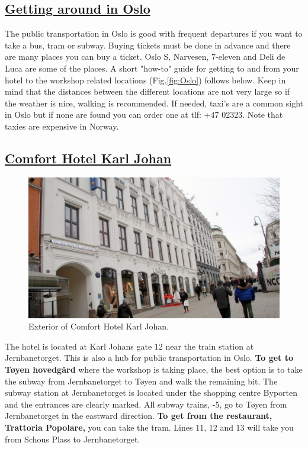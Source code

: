 \documentclass{article}
\begin{document}
\subsection*{\underline{Getting around in Oslo}}

The public transportation in Oslo is good with frequent
departures if you want
to take a bus, tram or subway. Buying tickets must be
done in advance and there are many places you can buy a
ticket. Oslo S, Narvesen, 7-eleven and Deli de Luca are some of the places.
A short "how-to" guide for getting to and from your hotel
 to the workshop related
locations (Fig.\ref{fig:Oslo}) follows below. Keep in mind that
the distances
between the different locations are not very large so if the
weather is nice, walking is recommended. If needed, taxi's
are a common sight in Oslo but if none are found you can order one
at tlf: +47 02323. Note that taxies are expensive in Norway.

\clearpage

\subsection*{\underline{Comfort Hotel Karl Johan}}

\begin{figure}
\centering
\includegraphics[scale=0.2]{img/comfort_karl_johan.jpg}
\caption{\label{fig:frog1}Exterior of Comfort Hotel Karl Johan.}
\end{figure}
The hotel is located at Karl Johans gate 12 near
the train station at Jernbanetorget.
This is also
a hub for public transportation in Oslo. \textbf{To get to
Tøyen hovedgård} where the workshop is taking place,
the best option is to take the subway from Jernbanetorget
to Tøyen and walk the remaining bit. The subway station
at Jernbanetorget is located under the shopping centre
Byporten and the entrances are clearly marked.
All subway trains,
-5, go to Tøyen from
Jernbanetorget in the eastward direction. \textbf{To get from
the restaurant, Trattoria Popolare,} you can take the tram. Lines
11, 12 and 13 will take you from Schous Plass to Jernbanetorget.
\end{document}
